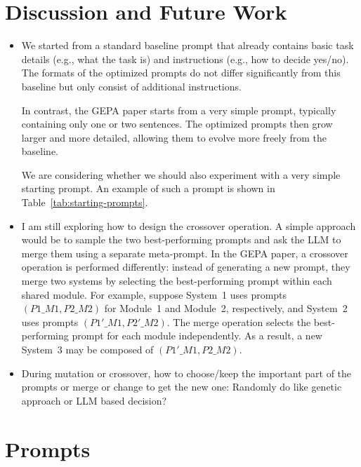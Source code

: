 \documentclass[12pt]{article}
\begin{document}
\section{Discussion and Future Work}
\begin{itemize}
    \item We started from a standard baseline prompt that already contains basic task details (e.g., what the task is) and instructions (e.g., how to decide yes/no). The formats of the optimized prompts do not differ significantly from this baseline but only consist of additional instructions.
    
    In contrast, the GEPA paper starts from a very simple prompt, typically containing only one or two sentences. The optimized prompts then grow larger and more detailed, allowing them to evolve more freely from the baseline.
    
    We are considering whether we should also experiment with a very simple starting prompt. An example of such a prompt is shown in Table~\ref{tab:starting-prompts}.

    \item I am still exploring how to design the crossover operation. A simple approach would be to sample the two best-performing prompts and ask the LLM to merge them using a separate meta-prompt. 
In the GEPA paper, a crossover operation is performed differently: instead of generating a new prompt, they merge two systems by selecting the best-performing prompt within each shared module. 
For example, suppose System~1 uses prompts $(P1\_M1, P2\_M2)$ for Module~1 and Module~2, respectively, and System~2 uses prompts $(P1'\_M1, P2'\_M2)$. 
The merge operation selects the best-performing prompt for each module independently. As a result, a new System~3 may be composed of $(P1'\_M1, P2\_M2)$.

    \item During mutation or crossover, how to choose/keep the important part of the prompts or merge or change to get the new one: Randomly do like genetic approach or LLM based decision?
\end{itemize}

\section{Prompts}
\label{sec:prompts}
\end{document}
